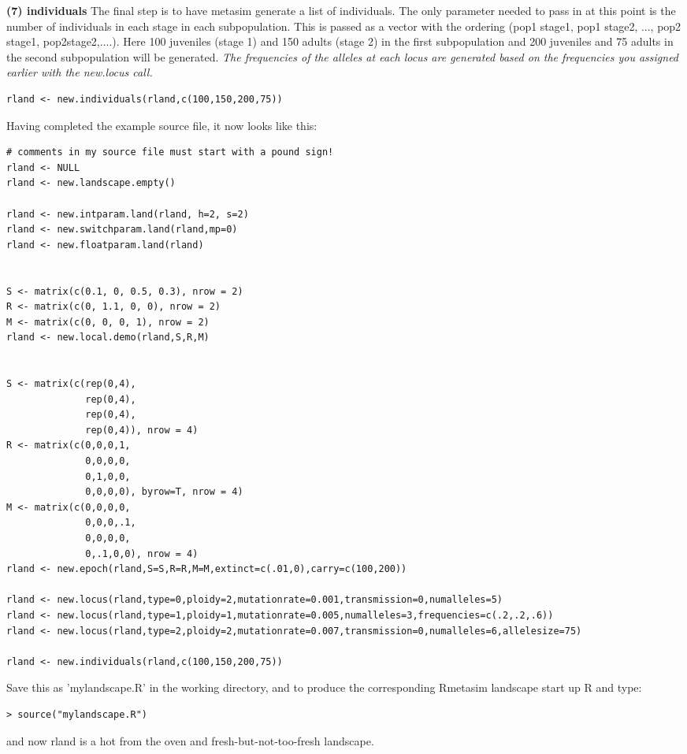 \documentclass{article}
\begin{document}
\begin{list}{}{\setlength{\labelsep}{10pt} \setlength{\leftmargin}{40pt}}
\item[\textbf{(7) individuals}]
The final step is to have metasim generate a list of individuals.  The only parameter needed to pass in at this point is the number of individuals in each stage in each subpopulation.  This is passed as a vector with the ordering (pop1 stage1, pop1 stage2, ..., pop2 stage1, pop2stage2,....).  Here 100 juveniles (stage 1) and 150 adults (stage 2) in the first subpopulation and 200 juveniles and 75 adults in the second subpopulation will be generated.  \textit{The frequencies of the alleles at each locus are generated based on the frequencies you assigned earlier with the new.locus call.}
\begin{verbatim}
rland <- new.individuals(rland,c(100,150,200,75))
\end{verbatim}
\end{list}

Having completed the example source file, it now looks like this:
\begin{verbatim}
# comments in my source file must start with a pound sign!
rland <- NULL
rland <- new.landscape.empty()

rland <- new.intparam.land(rland, h=2, s=2)
rland <- new.switchparam.land(rland,mp=0)
rland <- new.floatparam.land(rland)


S <- matrix(c(0.1, 0, 0.5, 0.3), nrow = 2)
R <- matrix(c(0, 1.1, 0, 0), nrow = 2)
M <- matrix(c(0, 0, 0, 1), nrow = 2)
rland <- new.local.demo(rland,S,R,M)


S <- matrix(c(rep(0,4),
              rep(0,4),
              rep(0,4),
              rep(0,4)), nrow = 4)
R <- matrix(c(0,0,0,1,
              0,0,0,0,
              0,1,0,0,
              0,0,0,0), byrow=T, nrow = 4)
M <- matrix(c(0,0,0,0,
              0,0,0,.1,
              0,0,0,0,
              0,.1,0,0), nrow = 4)
rland <- new.epoch(rland,S=S,R=R,M=M,extinct=c(.01,0),carry=c(100,200))

rland <- new.locus(rland,type=0,ploidy=2,mutationrate=0.001,transmission=0,numalleles=5)
rland <- new.locus(rland,type=1,ploidy=1,mutationrate=0.005,numalleles=3,frequencies=c(.2,.2,.6))
rland <- new.locus(rland,type=2,ploidy=2,mutationrate=0.007,transmission=0,numalleles=6,allelesize=75)

rland <- new.individuals(rland,c(100,150,200,75))
\end{verbatim}

Save this as 'mylandscape.R' in the working directory, and to produce the corresponding Rmetasim landscape start up R and type:
\begin{verbatim}
> source("mylandscape.R")
\end{verbatim}
and now rland is a hot from the oven and fresh-but-not-too-fresh landscape.
\end{document}
